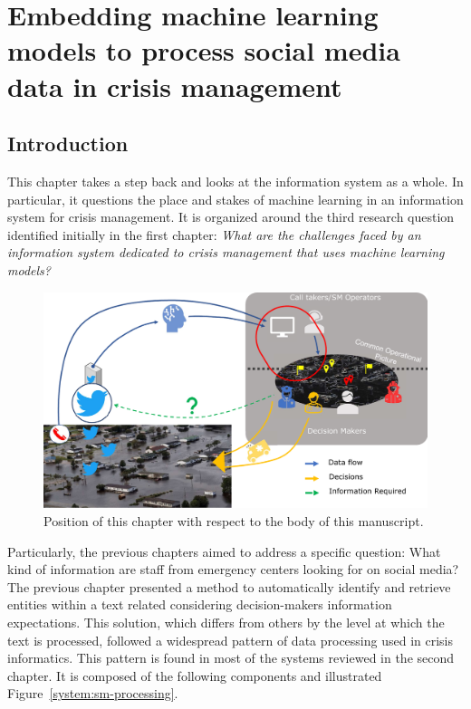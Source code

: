 \chapter{Embedding machine learning models to process social media data in crisis management}

\section*{Introduction}
This chapter takes a step back and looks at the information system as a whole.
In particular, it questions the place and stakes of machine learning in an information system for crisis management.
It is organized around the third research question identified initially in the first chapter:
\textit{What are the challenges faced by an information system dedicated to crisis management that uses machine learning models?}

\begin{figure}[htb]
    \centering
    \includegraphics[width=\textwidth]{figures/chap-5/position-chapter.pdf}
    \caption{Position of this chapter with respect to the body of this manuscript.}
    \label{system:big-picture-manuscrit}
\end{figure}

Particularly, the previous chapters aimed to address a specific question: What kind of information are staff from emergency centers looking for on social media?
The previous chapter presented a method to automatically identify and retrieve entities within a text related considering decision-makers information expectations.
This solution, which differs from others by the level at which the text is processed, followed a widespread pattern of data processing used in crisis informatics.
This pattern is found in most of the systems reviewed in the second chapter.
It is composed of the following components and illustrated Figure~\ref{system:sm-processing}.


